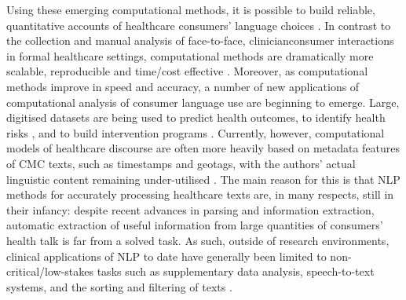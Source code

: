 
Using these emerging computational methods, it is possible to build reliable, quantitative accounts of healthcare consumers' language choices \cite[see][for a recent example]{maclean_forum77:_2015}. In contrast to the collection and manual analysis of face\hyp{}to\hyp{}face, clinician\textendash{}consumer interactions in formal healthcare settings, computational methods are dramatically more scalable, reproducible and time\slash cost effective \cite{yao_impact_2015}. Moreover, as computational methods improve in speed and accuracy, a number of new applications of computational analysis of consumer language use are beginning to emerge. Large, digitised datasets are being used to predict health outcomes, to identify health risks \cite{kim_use_2013,st_louis_can_2012,oleary_twitter_2015}, and to build intervention programs \cite{chen_dissecting_2015}. Currently, however, computational models of healthcare discourse are often more heavily based on metadata features of \gls{CMC} texts, such as timestamps and geotags, with the authors' actual linguistic content remaining under\hyp{}utilised \cite{yesha_method_2015}. The main reason for this is that \gls{NLP} methods for accurately processing healthcare texts are, in many respects, still in their infancy: despite recent advances in parsing and information extraction, automatic extraction of useful information from large quantities of \glspl{consumer}' health talk is far from a solved task. As such, outside of research environments, clinical applications of \gls{NLP} to date have generally been limited to non\hyp{}critical\slash low-stakes tasks such as supplementary data analysis, speech-to-text systems, and the sorting and filtering of texts \cite{maddox_natural_2015,wasfy_enhancing_2015}.



